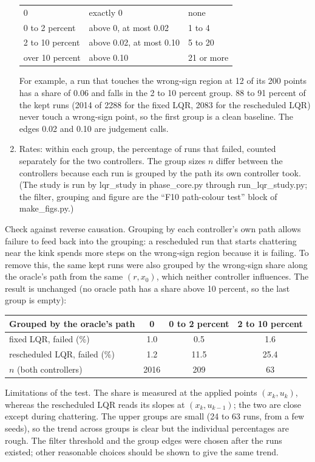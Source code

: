\documentclass[11pt]{article}
\begin{document}
\begin{enumerate}
\begin{center}
\begin{tabular}{lll}
\midrule
0 & exactly 0 & none \\
0 to 2 percent & above 0, at most 0.02 & 1 to 4 \\
2 to 10 percent & above 0.02, at most 0.10 & 5 to 20 \\
over 10 percent & above 0.10 & 21 or more \\
\bottomrule
\end{tabular}
\end{center}
For example, a run that touches the wrong-sign region at 12 of its 200 points has a share of 0.06 and falls in the 2 to 10 percent group. 88 to 91 percent of the kept runs (2014 of 2288 for the fixed LQR, 2083 for the rescheduled LQR) never touch a wrong-sign point, so the first group is a clean baseline. The edges 0.02 and 0.10 are judgement calls.
\item Rates: within each group, the percentage of runs that failed, counted separately for the two controllers. The group sizes $n$ differ between the controllers because each run is grouped by the path its own controller took. (The study is run by lqr\_study in phase\_core.py through run\_lqr\_study.py; the filter, grouping and figure are the ``F10 path-colour test'' block of make\_figs.py.)
\end{enumerate}

Check against reverse causation. Grouping by each controller's own path allows failure to feed back into the grouping: a rescheduled run that starts chattering near the kink spends more steps on the wrong-sign region because it is failing. To remove this, the same kept runs were also grouped by the wrong-sign share along the oracle's path from the same $(r,x_0)$, which neither controller influences. The result is unchanged (no oracle path has a share above 10 percent, so the last group is empty):
\begin{center}
\begin{tabular}{lccc}
\toprule
Grouped by the oracle's path & 0 & 0 to 2 percent & 2 to 10 percent \\
\midrule
fixed LQR, failed (\%) & 1.0 & 0.5 & 1.6 \\
rescheduled LQR, failed (\%) & 1.2 & 11.5 & 25.4 \\
$n$ (both controllers) & 2016 & 209 & 63 \\
\bottomrule
\end{tabular}
\end{center}

Limitations of the test. The share is measured at the applied points $(x_k,u_k)$, whereas the rescheduled LQR reads its slopes at $(x_k,u_{k-1})$; the two are close except during chattering. The upper groups are small (24 to 63 runs, from a few seeds), so the trend across groups is clear but the individual percentages are rough. The filter threshold and the group edges were chosen after the runs existed; other reasonable choices should be shown to give the same trend.
\end{document}
